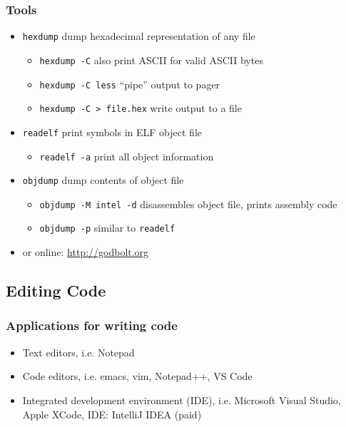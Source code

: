 \documentclass[12pt]{article}
\begin{document}
\subsubsection{Tools}
\begin{itemize}
    \item \texttt{hexdump} dump hexadecimal representation of any file
    \begin{itemize}
        \item \texttt{hexdump -C} also print ASCII for valid ASCII bytes
        \item \texttt{hexdump -C \textbar less} ``pipe'' output to pager
        \item \texttt{hexdump -C > file.hex} write output to a file
    \end{itemize}
    \item \texttt{readelf} print symbols in ELF object file
    \begin{itemize}
        \item \texttt{readelf -a} print all object information
    \end{itemize}
    \item \texttt{objdump} dump contents of object file
    \begin{itemize}
        \item \texttt{objdump -M intel -d} disassembles object file, prints assembly code
        \item \texttt{objdump -p} similar to \texttt{readelf}
    \end{itemize}
    \item or online: \url{http://godbolt.org}
\end{itemize}

\subsection{Editing Code}

\subsubsection{Applications for writing code}

\begin{itemize}
  \item Text editors, i.e. Notepad
  \item Code editors, i.e. emacs, vim, Notepad++, VS Code
  \item Integrated development environment (IDE), i.e. Microsoft Visual Studio, Apple XCode, IDE: IntelliJ IDEA (paid)
\end{itemize}
\end{document}

